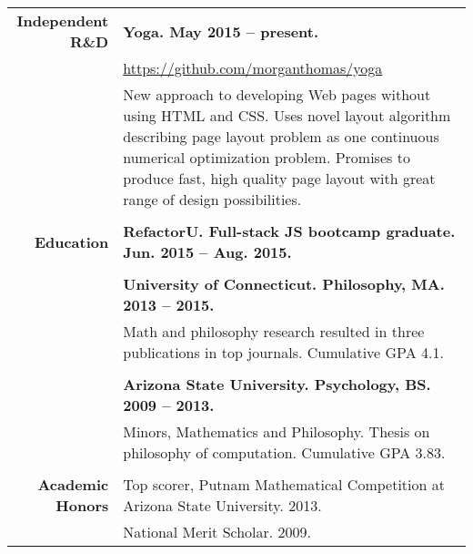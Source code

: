 \documentclass{article}
\begin{document}
\begin{tabular}{rl}
  {\bf Independent R\&D} & {\bf Yoga. May 2015 -- present.} \\ & \href{https://github.com/morganthomas/yoga}{https://github.com/morganthomas/yoga} \\
  & \parbox{4.5in}{New approach to developing Web pages without using HTML and CSS. Uses novel layout algorithm describing page layout problem as one continuous numerical optimization problem. Promises to produce fast, high quality page layout with great range of design possibilities.} \\ \\

  {\bf Education} & {\bf RefactorU. Full-stack JS bootcamp graduate. Jun. 2015 -- Aug. 2015.} \\ \\
  & {\bf University of Connecticut. Philosophy, MA. 2013 -- 2015.} \\
  & \parbox{4.5in}{Math and philosophy research resulted in three publications in top journals. Cumulative GPA 4.1.} \\ \\

  & {\bf Arizona State University. Psychology, BS. 2009 -- 2013.} \\
  & \parbox{4.5in}{Minors, Mathematics and Philosophy. Thesis on philosophy of computation. Cumulative GPA 3.83.} \\ \\



  {\bf Academic Honors} & Top scorer, Putnam Mathematical Competition at Arizona State University. 2013. \\
   & National Merit Scholar. 2009.
\end{tabular}
\egroup
\end{document}
